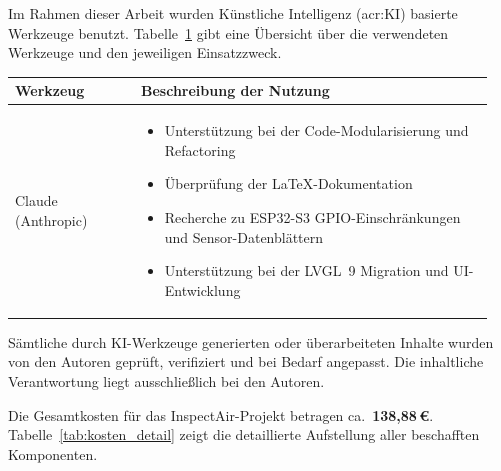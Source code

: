 \setcounter{chapter}{1}

Im Rahmen dieser Arbeit wurden Künstliche Intelligenz (\acrshort{acr:KI}) basierte Werkzeuge benutzt. Tabelle~\ref{tab:anhang_uebersicht_KI_werkzeuge} gibt eine Übersicht über die verwendeten Werkzeuge und den jeweiligen Einsatzzweck.

\begin{table}[hbt]	
	\centering
	\renewcommand{\arraystretch}{1.5}
	\label{tab:anhang_uebersicht_KI_werkzeuge}
	\begin{tabular}{>{\raggedright\arraybackslash}p{0.25\linewidth} >{\raggedright\arraybackslash}p{0.70\linewidth}}
		\textbf{Werkzeug} & \textbf{Beschreibung der Nutzung}\\
		\hline 
		\hline
		Claude (Anthropic) & \vspace{-\topsep}
					\begin{itemize}[noitemsep,topsep=0pt,partopsep=0pt,parsep=0pt] 
						\item Unterstützung bei der Code-Modularisierung und Refactoring
						\item Überprüfung der LaTeX-Dokumentation
						\item Recherche zu ESP32-S3 GPIO-Einschränkungen und Sensor-Datenblättern
						\item Unterstützung bei der LVGL~9 Migration und UI-Entwicklung
					\end{itemize} \\
		\hline 
	\end{tabular} 
\end{table}

Sämtliche durch KI-Werkzeuge generierten oder überarbeiteten Inhalte wurden von den Autoren geprüft, verifiziert und bei Bedarf angepasst. Die inhaltliche Verantwortung liegt ausschließlich bei den Autoren.

\setcounter{chapter}{2}
\setcounter{section}{0}
\setcounter{table}{0}

Die Gesamtkosten für das InspectAir-Projekt betragen ca.\ \textbf{138,88\,\euro{}}. Tabelle~\ref{tab:kosten_detail} zeigt die detaillierte Aufstellung aller beschafften Komponenten.

